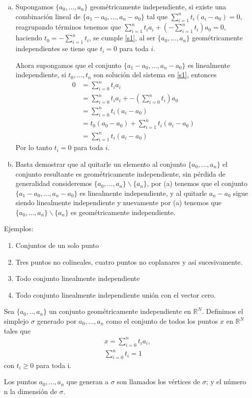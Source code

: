 \begin{Dem}
\begin{enumerate}[(a)]
\item Supongamos $\{a_0,...,a_n\}$ geométricamente independiente, si existe una combinación lineal de $\{a_1-a_0,...,a_n-a_0\}$ tal que $\sum_{i=1}^{n}t_i(a_i-a_0)=0$, reagrupando términos tenemos que $\sum_{i=1}^{n}t_ia_i + (-\sum_{i=1}^{n}t_i)a_0=0$, haciendo $t_0 = -\sum_{i=1}^{n}t_i$, se cumple \ref{s1}, al ser $\{a_0,...,a_n\}$ geométricamente independientes se tiene que $t_i=0$ para toda $i$.

Ahora supongamos que el conjunto $\{a_1-a_0,...,a_n-a_0\}$ es linealmente independiente, si $t_0,...,t_n$ son solución del sistema en \ref{s1}, entonces 
\begin{align*}
 0&=\sum_{i=0}^{n}t_ia_i\\
 &=\sum_{i=0}^{n}t_ia_i + -(\sum_{i=0}^{n}t_i)a_0\\
 &=\sum_{i=0}^{n}t_i(a_i-a_0)\\ 
 &= t_0(a_0-a_0) + \sum_{i=1}^{n}t_i(a_i-a_0)\\
 &=\sum_{i=1}^{n}t_i(a_i-a_0)
\end{align*}
Por lo tanto $t_i=0$ para toda $i$.
\item Basta demostrar que al quitarle un elemento al conjunto $\{a_0,...,a_n\}$
el conjunto resultante es geométricamente independiente, sin pérdida
de generalidad consideremos $\{a_0,...,a_n\}\backslash\{a_n\}$, por (a) tenemos que el
conjunto $\{a_1-a_0,...,a_n-a_0\}$ es linealmente independiente, y al quitarle
$a_n-a_0$ sigue siendo linealmente independiente y nuevamente por (a) 
tenemos que $\{a_0,...,a_n\}\backslash\{a_n\}$ es geométricamente independiente.
\end{enumerate}
\end{Dem}
Ejemplos:
\begin{enumerate}
\item Conjuntos de un solo punto
\item Tres puntos no colineales, cuatro puntos no coplanares y así sucesivamente.  
\item Todo conjunto linealmente independiente
\item Todo conjunto linealmente independiente unión con el vector cero. 
\end{enumerate}

\begin{Defi}[simplejo]
Sea $\{a_0,..,a_n\}$ un conjunto geométricamente independiente en  $\mathbb{R}^{N}$. Definimos el simplejo  $\sigma$ generado por $a_0,...,a_n$ como el conjunto de todos los puntos $x$ en $\mathbb{R}^{N}$ tales que 
\begin{equation}\label{s2}
\begin{split}
x = \sum_{i=0}^{n}t_ia_i,\\
\sum_{i=0}^{n}t_i=1
\end{split}
\end{equation}
con $t_i\geqslant 0$ para toda i.

Los puntos $a_0,...,a_n$ que generan a $\sigma$ son llamados los vértices de $\sigma$; y el número n la dimensión de $\sigma$.
\end{Defi}

